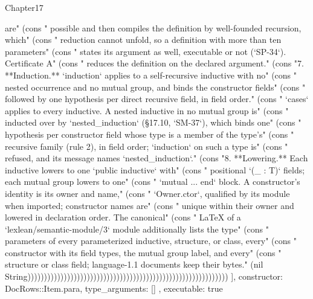 \begin{lexlean}{Chapter17}
\begin{semanticmodule}
{{are" (cons "   possible and then compiles the definition by well-founded recursion, which" (cons "   reduction cannot unfold, so a definition with more than ten parameters" (cons "   states its argument as well, executable or not (`SP-34`). Certificate A" (cons "   reduces the definition on the declared argument." (cons "7. **Induction.** `induction` applies to a self-recursive inductive with no" (cons "   nested occurrence and no mutual group, and binds the constructor fields" (cons "   followed by one hypothesis per direct recursive field, in field order." (cons "   `cases` applies to every inductive. A nested inductive in no mutual group is" (cons "   inducted over by `nested_induction` (§17.10, `SM-37`), which binds one" (cons "   hypothesis per constructor field whose type is a member of the type's" (cons "   recursive family (rule 2), in field order; `induction` on such a type is" (cons "   refused, and its message names `nested_induction`." (cons "8. **Lowering.** Each inductive lowers to one `public inductive` with" (cons "   positional `(_ : T)` fields; each mutual group lowers to one" (cons "   `mutual ... end` block. A constructor's identity is its owner and name," (cons "   `Owner.ctor`, qualified by its module when imported; constructor names are" (cons "   unique within their owner and lowered in declaration order. The canonical" (cons "   LaTeX of a `lexlean/semantic-module/3` module additionally lists the type" (cons "   parameters of every parameterized inductive, structure, or class, every" (cons "   constructor with its field types, the mutual group label, and every" (cons "   structure or class field; language-1.1 documents keep their bytes." (nil String)))))))))))))))))))))))))))))))))))))))))))))))))))))))))))))
    ],
    constructor: DocRows::Item.para,
    type_arguments: []
  },
  executable: true
}


\end{semanticmodule}
\end{lexlean}
